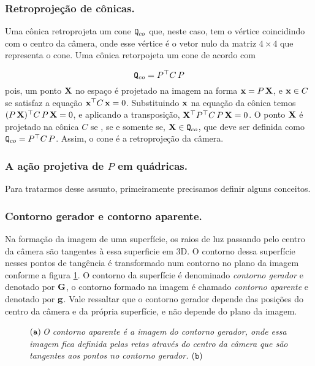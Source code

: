 \subsubsection*{Retroprojeção de cônicas.}
Uma cônica retroprojeta um cone ${\tt Q}_{co}$ que, neste caso, tem o vértice coincidindo com o centro da câmera, onde esse vértice é o vetor nulo da matriz $4\times4$ que representa o cone. Uma cônica retorpojeta um cone de acordo com 

\begin{equation*}
{\tt Q}_{co}=P^\top C\,P
\end{equation*}
pois, um ponto $\mathbf{X}$ no espaço é projetado na imagem na forma $\mathbf{x}=P\,\mathbf{X}$, e $\mathbf{x}\in C$ se satisfaz a equação $\mathbf{x}^\top C\,\mathbf{x}=0$. Substituindo $\mathbf{x}$ na equação da cônica temos $(P\,\mathbf{X})^\top C\,P\,\mathbf{X}=0$, e aplicando a transposição, $\mathbf{X}^\top P^\top C\,P\,\mathbf{X}=0$. O ponto $\mathbf{X}$ é projetado na cônica $C$ se , se e somente se, $\mathbf{X}\in {\tt Q}_{co}$, que deve ser definida como ${\tt Q}_{co}=P^\top C\,P$. Assim, o cone é a retroprojeção da câmera. 

\subsubsection{A ação projetiva de $P$ em quádricas.}\label{sec.proj-quadricas}
Para tratarmos desse assunto, primeiramente precisamos definir alguns conceitos.

\subsubsection*{Contorno gerador e contorno aparente.}
Na formação da imagem de uma superfície, os raios de luz passando pelo centro da câmera são tangentes à essa superficie em 3D. O contorno dessa superfície nesses pontos de tangência é transformado num contorno no plano da imagem conforme a figura \ref{fig.cont-gerador-aparente}. O contorno da superfície é denominado \textit{contorno gerador} e denotado por ${\bf G}$, o contorno formado na imagem é chamado \textit{contorno aparente} e denotado por ${\bf g}$. Vale ressaltar que o contorno gerador depende das posições do centro da câmera e da própria superfície, e não depende do plano da imagem.  

\begin{figure}[htb!]
\centering
{}
\caption{\textit{$({\tt a})\,$O contorno aparente é a imagem do contorno gerador, onde essa imagem fica definida pelas retas através do centro da câmera que são tangentes aos pontos no contorno gerador.$\,\,({\tt b})\,$}}
\label{fig.cont-gerador-aparente}
\end{figure}

